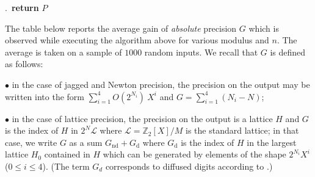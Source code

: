 \documentclass{sig-alternate-2013}
\newcommand{\Z}{\mathbb Z}
\begin{document}
.\ {\bf return} $P$

\vspace{-1ex}\noindent\hrulefill

\medskip

The table below reports the average gain of \emph{absolute} 
precision $G$ which is observed while executing the algorithm above 
for various modulus and $n$. The average is taken on a sample of $1000$ 
random inputs. We recall that $G$ is defined as follows:

\noindent $\bullet$
in the case of jagged and Newton precision, the precision on the output 
may be written into the form $\sum_{i=1}^4 O(2^{N_i}) \: X^i$ and 
$G = \sum_{i=1}^4 (N_i - N)$;

\noindent $\bullet$
in the case of lattice precision, the precision on the output is a 
lattice $H$ and $G$ is the index of $H$ in $2^N \mathcal L$ where 
$\mathcal L = \Z_2[X]/M$ is the standard lattice; in that case, we write 
$G$ as a sum $G_{\text{nd}} + G_{\text{d}}$ where $G_{\text{d}}$ is the 
index of $H$ in the largest lattice $H_0$ contained in $H$ which can be 
generated by elements of the shape $2^{N_i} X^i$ ($0 \leq i \leq 4$). 
(The term $G_d$ corresponds to diffused digits according to 
\cite[Definition 2.3]{preclinalg}.)

\medskip
\end{document}
